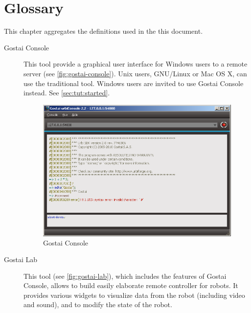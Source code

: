 
\chapter{Glossary}
\label{sec:glossary}

This chapter aggregates the definitions used in the this document.

\begin{description}
\item[Gostai Console] This tool provide a graphical user interface for
  Windows users to a remote \urbi server (see
  \autoref{fig:gostai-console}).  Unix users, GNU/Linux or Mac OS X,
  can use the traditional  tool.  Windows users are
  invited to use Gostai Console instead.  See
  \autoref{sec:tut:started}.

  \begin{figure}[htp]
    \centering
    \includegraphics[width=.8\linewidth]{img/urbi-console}
    \caption{Gostai Console}
    \label{fig:gostai-console}
  \end{figure}


\item[Gostai Lab] This tool (see \autoref{fig:gostai-lab}), which
  includes the features of Gostai Console, allows to build easily
  elaborate remote controller for robots.  It provides various widgets
  to visualize data from the robot (including video and sound), and to
  modify the state of the robot.


\end{description}
